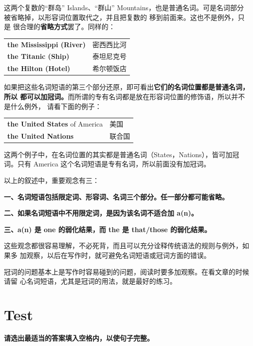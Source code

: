 这两个复数的“群岛” Islands、“群山” Mountains，也是普通名词。可是名词部分
被省略掉，以形容词位置取代之，并且把复数的  移到前面来。这也不是例外，只是
很合理的\textbf{省略方式}罢了。同样的：

\begin{longtable}[]{@{}ll@{}}
  \textbf{the Mississippi (River)} & 密西西比河 \\
  \textbf{the Titanic (Ship)} & 泰坦尼克号 \\
  \textbf{the Hilton (Hotel)} & 希尔顿饭店 \\
\end{longtable}

如果把这些名词短语的第三个部分还原，即可看出\textbf{它们的名词位置都是普通名词，所以
  都可以加冠词。}而所谓的专有名词都是放在形容词位置的修饰语，所以并不是什么例外，
请看下面的例子：

\begin{longtable}[]{@{}ll@{}}
  \textbf{the United States} of America& 美国 \\
  \textbf{the United Nations} & 联合国 \\
\end{longtable}

这两个例子中，在名词位置的其实都是普通名词（States，Nations），皆可加冠词。只有
America 这个名词短语是专有名词，所以前面没有加冠词。

以上的叙述中，重要观念有三：

\textbf{一、名词短语包括限定词、形容词、名词三个部分。任一部分都可能省略。}

\textbf{二、如果名词短语中不用限定词，是因为该名词不适合加 a(n)。}

\textbf{三、a(n) 是 one 的弱化结果，而 the 是 that/those 的弱化结果。}

这些观念都很容易理解，不必死背，而且可以充分诠释传统语法的规则与例外，如果多
加观察，以后在写作时，就可避免名词短语或冠词方面的错误。

冠词的问题基本上是写作时容易碰到的问题，阅读时要多加观察。在看文章的时候请留
心名词短语，尤其是冠词的用法，就是最好的练习。

\section{Test}


\textbf{请选出最适当的答案填入空格内，以使句子完整。}


